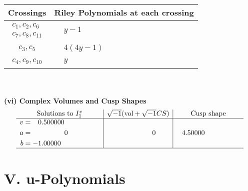 \documentclass[1p]{elsarticle_modified}
\theoremstyle{definition}
\newcommand{\I}{\sqrt{-1}}
\begin{document}
\begin{tabular}{m{50pt}|m{274pt}}
Crossings & \hspace{64pt}Riley Polynomials at each crossing \\
\hline $$\begin{aligned}c_{1},c_{2},c_{6}\\c_{7},c_{8},c_{11}\end{aligned}$$&$\begin{aligned}
&y-1
\end{aligned}$\\
\hline $$\begin{aligned}c_{3},c_{5}\end{aligned}$$&$\begin{aligned}
&4(4 y-1)
\end{aligned}$\\
\hline $$\begin{aligned}c_{4},c_{9},c_{10}\end{aligned}$$&$\begin{aligned}
&y
\end{aligned}$\\
\hline
\end{tabular}\\~\\
\newpage\flushleft \textbf{(vi) Complex Volumes and Cusp Shapes}
$$\begin{array}{c|c|c}  
\text{Solutions to }I^v_{1}& \I (\text{vol} + \sqrt{-1}CS) & \text{Cusp shape}\\
 \hline 
\begin{aligned}
v &= \phantom{-}0.500000\phantom{ +0.000000I} \\
a &= \phantom{-0.000000 } 0 \\
b &= -1.00000\phantom{ +0.000000I}\end{aligned}
 & \phantom{-0.000000 } 0 & \phantom{-}4.50000\phantom{ +0.000000I}\\
 \hline 
 \end{array}$$\newpage
\newpage\renewcommand{\arraystretch}{1}
\centering \section*{ V. u-Polynomials}
\end{document}
